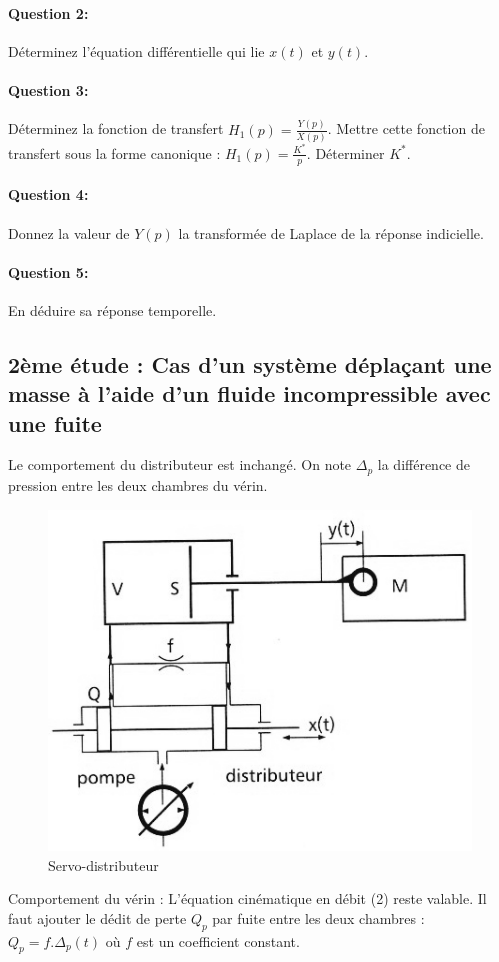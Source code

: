\paragraph{Question 2:} Déterminez l'équation différentielle qui lie $x(t)$ et $y(t)$.

\paragraph{Question 3:} Déterminez la fonction de transfert $H_1(p)=\frac{Y(p)}{X(p)}$. Mettre cette fonction de transfert sous la forme canonique : $H_1(p)=\frac{K^*}{p}$. Déterminer $K^*$.

\paragraph{Question 4:} Donnez la valeur de $Y(p)$ la transformée de Laplace de la réponse indicielle.

\paragraph{Question 5:} En déduire sa réponse temporelle. 

\subsection{2ème étude : Cas d'un système déplaçant une masse à l'aide d'un fluide incompressible avec une fuite}

Le comportement du distributeur est inchangé.
On note $\Delta_p$ la différence de pression entre les deux chambres du vérin.

\begin{figure}[!h]
 \centering\includegraphics[width=0.4\linewidth]{img/diravi5.png}
 \caption{Servo-distributeur}
 \label{diravi5}
\end{figure}

Comportement du vérin : L'équation cinématique en débit (2) reste valable. Il faut ajouter le dédit de perte $Q_p$ par fuite entre les deux chambres : $Q_p=f.\Delta_p(t)$ où $f$ est un coefficient constant.

